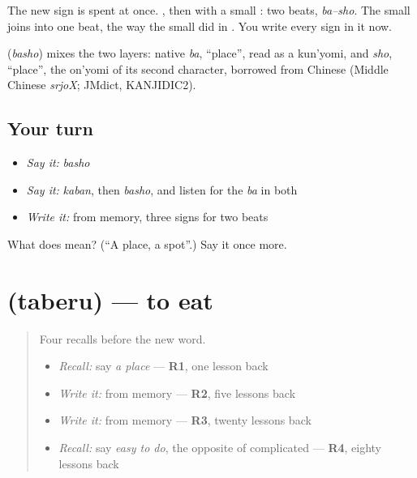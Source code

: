 The new sign is spent at once. \textbf{}, then \textbf{} with a small \textbf{}: two beats, \emph{ba–sho}. The small \textbf{} joins \textbf{} into one beat, the way the small \textbf{} did in \textbf{}. You write every sign in it now.

\begin{cousinweb}
\textbf{} (\emph{basho}) mixes the two layers: native \emph{ba}, \textquotedblleft{}place\textquotedblright{}, read as a kun'yomi, and \emph{sho}, \textquotedblleft{}place\textquotedblright{}, the on'yomi of its second character, borrowed from Chinese (Middle Chinese \emph{srjoX}; JMdict, KANJIDIC2).
\end{cousinweb}

\subsection*{Your turn}
\begin{itemize}
\raggedright
  \item \emph{Say it:} \emph{basho}
  \item \emph{Say it:} \emph{kaban}, then \emph{basho}, and listen for the \emph{ba} in both
  \item \emph{Write it:} \textbf{} from memory, three signs for two beats
\end{itemize}

\begin{tcolorbox}[breakable,colback=teal!4,colframe=teal!35!black,title={Before you move on}]
What does  mean? (\textquotedblleft{}A place, a spot\textquotedblright{}.) Say it once more.
\end{tcolorbox}
\section[\texorpdfstring{\ja{たべる} (taberu)}{たべる (taberu)}]{ (taberu) — to eat}

\label{lesson:JA-C134-taberu}



\begin{quote}
Four recalls before the new word.

\begin{itemize}
\raggedright
  \item \emph{Recall:} say \emph{a place} — \textbf{R1}, one lesson back
  \item \emph{Write it:} \textbf{} from memory — \textbf{R2}, five lessons back
  \item \emph{Write it:} \textbf{} from memory — \textbf{R3}, twenty lessons back
  \item \emph{Recall:} say \emph{easy to do}, the opposite of complicated — \textbf{R4}, eighty lessons back
\end{itemize}
\end{quote}

